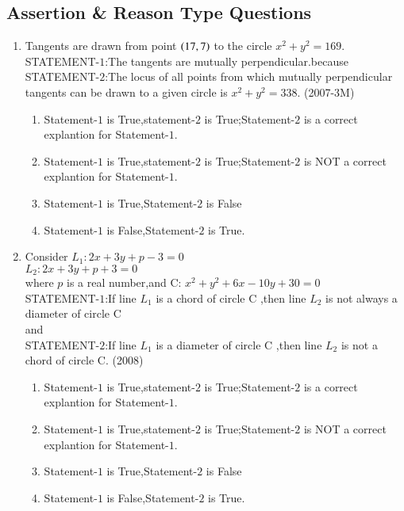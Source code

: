 \documentclass[journal]{IEEEtran}
\numberwithin{equation}{enumi}
\numberwithin{figure}{enumi}
\begin{document}
\subsection{Assertion \& Reason Type Questions}
\begin{enumerate}
\item Tangents are drawn from point $\left(17 , 7\right)$ to the circle $x^2+y^2=169$.\\
STATEMENT-$1$:The tangents are mutually perpendicular.because\\
STATEMENT-$2$:The locus of all points from which mutually perpendicular tangents can be drawn to a given circle is $x^2+y^2=338$. \hfill(2007-3M)\\
\begin{enumerate}
\item Statement-$1$ is True,statement-$2$ is True;Statement-$2$ is a correct explantion for Statement-$1$.
\item Statement-$1$ is True,statement-$2$ is True;Statement-$2$ is NOT a correct explantion for Statement-$1$.
\item Statement-$1$ is True,Statement-$2$ is False
\item Statement-$1$ is False,Statement-$2$ is True.
\end{enumerate}

\item Consider $L_1:2x+3y+p-3=0$\\
               $L_2:2x+3y+p+3=0$\\
where $p$ is a real number,and C: $x^2+y^2+6x-10y+30=0$\\
STATEMENT-$1$:If line $L_1$ is a chord of circle C ,then line $L_2$ is not always a diameter of circle C\\
and\\
STATEMENT-$2$:If line $L_1$ is a diameter of circle C ,then line $L_2$ is not a chord  of circle C. \hfill(2008)\\
\begin{enumerate}
\item Statement-$1$ is True,statement-$2$ is True;Statement-$2$ is a correct explantion for Statement-$1$.
\item Statement-$1$ is True,statement-$2$ is True;Statement-$2$ is NOT a correct explantion for Statement-$1$.
\item Statement-$1$ is True,Statement-$2$ is False
\item Statement-$1$ is False,Statement-$2$ is True.	
\end{enumerate}
\end{enumerate}
\end{document}
